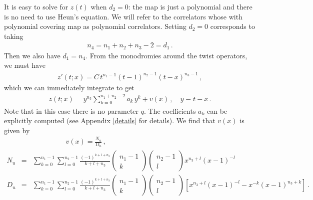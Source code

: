 \documentclass[letterpaper]{JHEP3}
\def\be{\begin{equation}}
\def\ee{\end{equation}}
\def\be{\begin{eqnarray}}
\def\ee{\end{eqnarray}}
\begin{document}
It is easy to solve for $z(t)$ when $d_2=0$: the map is just a polynomial
and there is no need to use Heun's equation. We will refer to the correlators whose with polynomial covering map 
as polynomial correlators.
Setting $d_2=0$  corresponds to taking
\be n_4=n_1+n_2+n_3-2 = d_1\,.\ee 
Then we also have $d_1=n_4$. 
From the monodromies around the twist operators, we must have
\be
 z'(t; x)=C\,t^{n_1-1}(t-1)^{n_2-1}(t-x)^{n_3-1} \, ,
\ee  which we can immediately integrate to get
\be
z(t; x)=y^{n_3}\sum_{k=0}^{n_1+n_2-2}a_k\, y^k+v(x) \, ,\quad  y\equiv t-x\,.
\ee 
Note that in this case there is no parameter $q$.
The coefficients $a_k$ can be explicitly computed (see Appendix \ref{details} for details). We find that $v(x)$ is given by
\be
&&  \hspace{2cm} v(x)  =  \frac{N_u}{D_u}\, , \\
N_u & = & \sum_{k=0}^{n_1-1}\sum_{l=0}^{n_2-1}\frac{(-1)^{k+l+n_3}}{k+l+n_3}
\left(
\begin{array}{c}
n_1-1  \\
k
\end{array}
\right)
\left(
\begin{array}{c}
n_2-1  \\
l
\end{array}
\right)
x^{n_3+l}(x-1)^{-l}\, \nonumber \\
D_u & = & \sum_{k=0}^{n_1-1}\sum_{l=0}^{n_2-1}\frac{(-1)^{k+l+n_3}}{k+l+n_3}
\left(
\begin{array}{c}
n_1-1  \\
k
\end{array}
\right)
\left(
\begin{array}{c}
n_2-1  \\
l
\end{array}
\right)
\left[x^{n_3+l}(x-1)^{-l}-x^{-k}(x-1)^{n_3+k}\right]\,.
\nonumber
\ee
\end{document}

